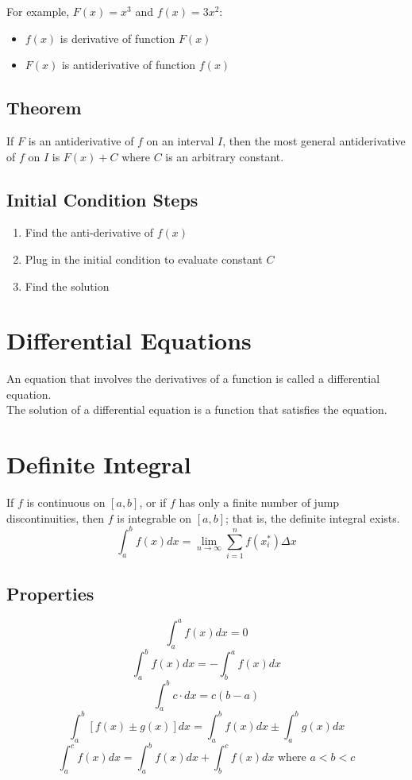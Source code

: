 \documentclass[12pt]{article}
\begin{document}
\noindent For example, $F(x)=x^3$ and $f(x) = 3x^2$:
\begin{itemize}
    \item $f(x)$ is derivative of function $F(x)$
    \item $F(x)$ is antiderivative of function $f(x)$
\end{itemize}

\subsection{Theorem} If $F$ is an antiderivative of $f$ on an interval $I$, then the most general antiderivative of $f$ on $I$ is $F(x)+C$ where $C$ is an arbitrary constant.

\subsection{Initial Condition Steps}
\begin{enumerate}
    \item Find the anti-derivative of $f(x)$
    \item Plug in the initial  condition to evaluate constant $C$
    \item Find the solution
\end{enumerate}

\section{Differential Equations} An equation that involves the derivatives of a function is called a differential equation.\\
The solution of a differential equation is a function that satisfies the equation. 


\section{Definite Integral} 

If $f$ is continuous on $[a,b]$, or if $f$ has only a finite number of jump discontinuities, then $f$ is integrable on $[a,b]$; that is, the definite integral exists.
$$\int_a^b f(x) dx=\lim_{n\to \infty} \sum_{i=1}^{n} f(x_i^*)\Delta x$$


\subsection{Properties}

$$\int_a^a f(x) dx = 0$$
$$\int_a^b f(x) dx = -\int_b^a f(x) dx$$
$$\int_a^b c \cdot dx = c(b-a)$$
$$\int_a^b \left[f(x) \pm g(x)\right] dx = \int_a^b f(x) dx \pm \int_a^b g(x) dx$$
$$\int_a^c f(x) dx = \int_a^b f(x) dx + \int_b^c f(x) dx \text{ where } a < b < c$$
\end{document}
